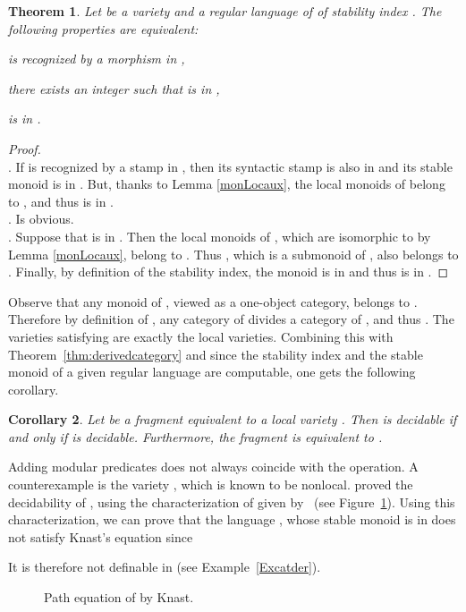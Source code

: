 \documentclass[submission,hidelink]{dmtcs-episciences}
\newtheorem{theorem}{Theorem}
\newtheorem{corollary}[theorem]{Corollary}
\newenvironment{conditions}
{\begin{list}{\rm (\theenumi)}{\noindent \usecounter{enumi}\setlength{\topsep}{2pt}\setlength{\partopsep}{0pt}\setlength{\itemsep}{2pt}\setlength{\parsep}{0pt}\setlength{\leftmargin}{2.5em}\setlength{\labelwidth}{1.5em}\setlength{\labelsep}{0.5em}\setlength{\listparindent}{0pt}\setlength{\itemindent}{0pt}}}{\end{list}}
\begin{document}
	\begin{theorem}\label{QVlV}
	Let  be a variety and  a regular language of  of
	stability index . The following properties are equivalent:
	\begin{conditions}
	\item\label{qv}  is recognized by a morphism in ,
	\item\label{dlv} there exists an integer  such that  is in ,
	\item\label{slv}  is in .
	\end{conditions}
	\end{theorem}
	\begin{proof}
\\
	. If  is recognized by a stamp in , then its syntactic stamp is also in 
			and its stable monoid
			is in . But, thanks to Lemma \ref{monLocaux},
			the local monoids of   belong to , and thus  is in .\\
	. Is obvious.\\
	. Suppose that  is in .
			Then the local monoids of ,
			which are isomorphic to  by Lemma \ref{monLocaux}, belong to .
			Thus , which is a submonoid of , also
			belongs to . Finally, by definition of the stability index, the monoid
			 is in  and thus
			 is in .
	\end{proof}

	Observe that any monoid of , viewed as a one-object category,
	belongs to . Therefore by definition of , any category of 
	divides a category of , and thus .
	The varieties satisfying  are exactly the  local varieties.
	Combining this with Theorem~\ref{thm:derivedcategory} and
	 since the stability index and the stable monoid of
	 a given regular language are computable, one gets the following corollary.
	 \begin{corollary}
		Let  be a fragment equivalent to a local variety . Then  is
		decidable  if and only if  is decidable. Furthermore, the fragment  is
		equivalent to .
	\end{corollary}

		Adding modular predicates does not always coincide with the  operation.
		A counterexample is the variety , which is known to be nonlocal.
		\cite{CPS06b} proved the decidability of , using the
		characterization of  given by~\cite{Kna83} (see Figure~\ref{gJ}).
		Using this characterization, we can prove that the language ,
		whose stable monoid is in  does not satisfy Knast's equation since
		
		It is therefore not definable in  (see Example~\ref{Excatder}).
\begin{figure}[H]
\centering
{}
\caption{Path equation of  by Knast. }\label{gJ}
\end{figure}
\end{document}
